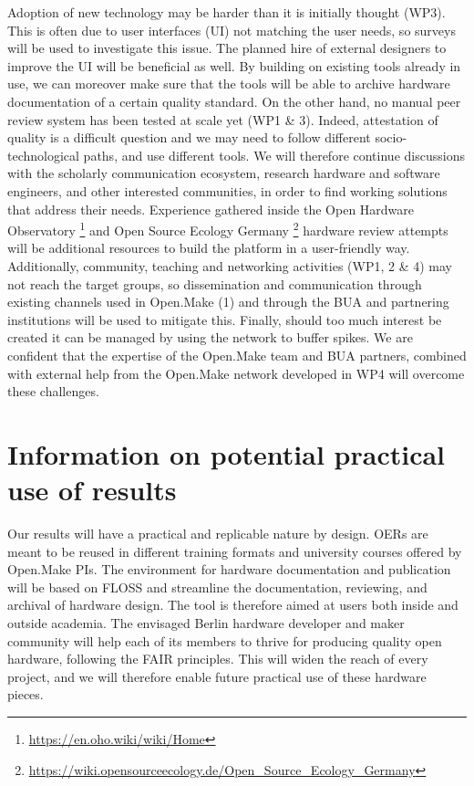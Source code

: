 \documentclass[
  12pt,
  a4paper,
]{article}
\begin{document}
Adoption of new technology may be harder than it is initially thought
(WP3). This is often due to user interfaces (UI) not matching the user
needs, so surveys will be used to investigate this issue. The planned
hire of external designers to improve the UI will be beneficial as well.
By building on existing tools already in use, we can moreover make sure
that the tools will be able to archive hardware documentation of a
certain quality standard. On the other hand, no manual peer review
system has been tested at scale yet (WP1 \& 3). Indeed, attestation of
quality is a difficult question and we may need to follow different
socio-technological paths, and use different tools. We will therefore
continue discussions with the scholarly communication ecosystem,
research hardware and software engineers, and other interested
communities, in order to find working solutions that address their
needs. Experience gathered inside the Open Hardware Observatory
\footnote{\url{https://en.oho.wiki/wiki/Home}} and Open Source Ecology
Germany \footnote{\url{https://wiki.opensourceecology.de/Open_Source_Ecology_Germany}}
hardware review attempts will be additional resources to build the
platform in a user-friendly way. Additionally, community, teaching and
networking activities (WP1, 2 \& 4) may not reach the target groups, so
dissemination and communication through existing channels used in
Open.Make (1) and through the BUA and partnering institutions will be
used to mitigate this. Finally, should too much interest be created it
can be managed by using the network to buffer spikes. We are confident
that the expertise of the Open.Make team and BUA partners, combined with
external help from the Open.Make network developed in WP4 will overcome
these challenges.

\hypertarget{information-on-potential-practical-use-of-results}{%
\section{Information on potential practical use of
results}\label{information-on-potential-practical-use-of-results}}

Our results will have a practical and replicable nature by design. OERs
are meant to be reused in different training formats and university
courses offered by Open.Make PIs. The environment for hardware
documentation and publication will be based on FLOSS and streamline the
documentation, reviewing, and archival of hardware design. The tool is
therefore aimed at users both inside and outside academia. The envisaged
Berlin hardware developer and maker community will help each of its
members to thrive for producing quality open hardware, following the
FAIR principles. This will widen the reach of every project, and we will
therefore enable future practical use of these hardware pieces.
\end{document}
